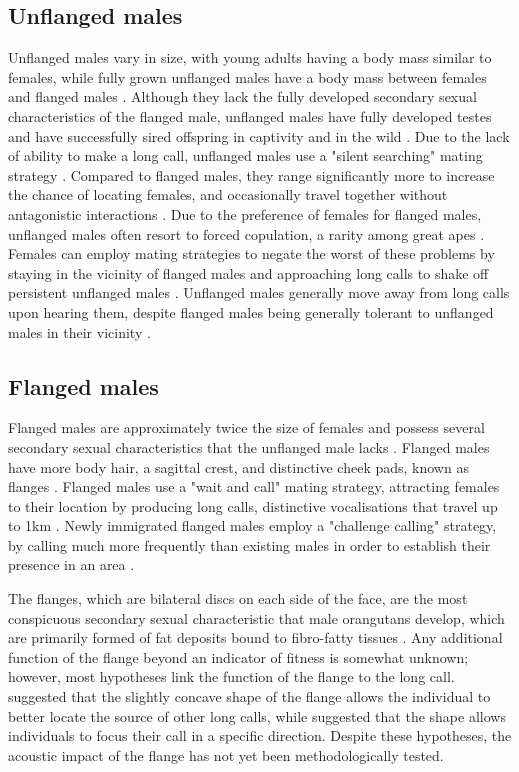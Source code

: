 \subsection{Unflanged males}
Unflanged males vary in size, with young adults having a body mass similar to females, while fully grown unflanged males have a body mass between females and flanged males \citep{Kralick.2021}. Although they lack the fully developed secondary sexual characteristics of the flanged male, unflanged males have fully developed testes and have successfully sired offspring in captivity and in the wild \citep{Utami.2002km8}.  Due to the lack of ability to make a long call, unflanged males use a "silent searching" mating strategy \citep{Knott.2008}. Compared to flanged males, they range significantly more to increase the chance of locating females, and occasionally travel together without antagonistic interactions \citep{Setia.2008}.  Due to the preference of females for flanged males, unflanged males often resort to forced copulation, a rarity among great apes \citep{Knott.2009y9d}. Females can employ mating strategies to negate the worst of these problems by staying in the vicinity of flanged males and approaching long calls to shake off persistent unflanged males \citep{Knott.2009}. Unflanged males generally move away from long calls upon hearing them, despite flanged males being generally tolerant to unflanged males in their vicinity \citep{Spillmann.2010}. 

\subsection{Flanged males}
Flanged males are approximately twice the size of females and possess several secondary sexual characteristics that the unflanged male lacks \citep{Prasetyo.2021}. Flanged males have more body hair, a sagittal crest, and distinctive cheek pads, known as flanges \citep{Galdikas.1978}. Flanged males use a "wait and call" mating strategy, attracting females to their location by producing long calls, distinctive vocalisations that travel up to 1km \citep{Knott.2008, Utami.2002km8, Prasetyo.2019}. Newly immigrated flanged males employ a "challenge calling" strategy, by calling much more frequently than existing males in order to establish their presence in an area \citep{Hayward.2018}. 

The flanges, which are bilateral discs on each side of the face, are the most conspicuous secondary sexual characteristic that male orangutans develop, which are primarily formed of fat deposits bound to fibro-fatty tissues \citep{Straus.1942}. Any additional function of the flange beyond an indicator of fitness is somewhat unknown; however, most hypotheses link the function of the flange to the long call. \citet{Galdikas.1983} suggested that the slightly concave shape of the flange allows the individual to better locate the source of other long calls, while \citet{Mitani.1985ak1m} suggested that the shape allows individuals to focus their call in a specific direction. Despite these hypotheses, the acoustic impact of the flange has not yet been methodologically tested.


